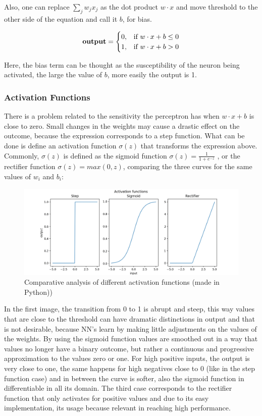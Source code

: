 Also, one can replace $ \sum_j w_j x_j$ as the dot product $w \cdot x $ and move threshold to the other side of the equation and call it $b$, for bias.

 \begin{equation}
 \mbox{\textbf{output}} = \begin{cases} 0, & \mbox{if } w \cdot x + b \le 0 \\ 1, & \mbox{if }  w \cdot x + b > 0 \end{cases}
 \end{equation}

Here, the bias term can be thought as the susceptibility of the neuron being activated, the large the value of $b$, more easily the output is 1. 

\subsubsection{Activation Functions}
There is a problem related to the sensitivity the perceptron has when $w \cdot x + b $ is close to zero. Small changes in the weights may cause a drastic effect on the outcome, because the expression corresponds to a step function. What can be done is define an activation function $\sigma(z)$ that transforms the expression above. Commonly,  $\sigma(z)$ is defined as the sigmoid function $\sigma(z) = \frac{1}{1+e^{-z}}$ , or the rectifier function $\sigma(z) = max(0,z) $, comparing the three curves for the same values of $w_i$ and $b_i$:

\begin{figure}[H]
	\centering
	\includegraphics[scale=1, width=\linewidth]{figures/activationfunc.png}
	\caption{Comparative analysis of different activation functions (made in Python))}
	\label{perceptron}
\end{figure} 
In the first image, the transition from 0 to 1 is abrupt and steep, this way values that are close to the threshold can have dramatic distinctions in output and that is not desirable, because NN's learn by making little adjustments on the values of the weights. By using the sigmoid function values are smoothed out in a way that values no longer have a binary outcome, but rather a continuous and  progressive approximation to the values zero or one. For high positive inputs, the output is very close to one, the same happens for high negatives close to 0 (like in the step function case) and in between the curve is softer, also the sigmoid function in differentiable in all its domain. The third case corresponds to the rectifier function that only activates for positive values and due to its easy implementation, its usage because relevant in reaching high performance.

